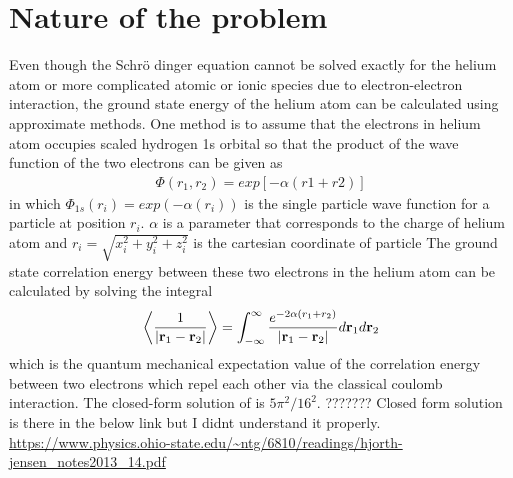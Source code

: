 \section{Nature of the problem}
\label{sec:NatureOfTheProblem}
Even though the Schr\"{o} dinger equation cannot be solved exactly for the helium atom or more complicated atomic or ionic species due to  electron-electron interaction, the ground state energy of the helium atom can be calculated using approximate methods. 
One method is to assume that the electrons in helium atom occupies scaled hydrogen 1s orbital so that the product of the wave function of the two electrons can be given as
\begin{align}
	\Phi (r_1, r_2 ) = exp[-\alpha ( r1+ r2)]
	\label{eq:NatureOfTheProblem1}
\end{align}
in which $\Phi_{1s}(r_i) = exp(-\alpha ( r_i))$ is the single particle wave function for a particle at position $r_i$.
$\alpha$ is a parameter that corresponds to the charge of helium atom and 
$r_i = \sqrt{x_i^2+y_i^2+z_i^2}$ 
is the cartesian coordinate of particle
The ground state correlation energy between these two electrons in the helium atom can be calculated by solving the integral
\begin{align}
	\left< \frac{1}{| \mbox{\textbf{r}}_1 - \mbox{\textbf{r}}_2 |} \right> 
   = \int _{-\infty } ^{\infty } \frac{e^{-2\alpha (r_1+r_2)}}{| \mbox{\textbf{r}}_1 - \mbox{\textbf{r}}_2 |} d \mbox{\textbf{r}}_1 d\mbox{\textbf{r}}_2
   \label{eq:NatureOfTheProblem2}
\end{align}
which is the quantum mechanical expectation value of the correlation energy between two electrons which repel each other via the classical coulomb interaction.
The closed-form solution of  is $5\pi ^2 / 16^2$.
??????? Closed form solution is there in the below link but I didnt understand it properly.
\url{https://www.physics.ohio-state.edu/~ntg/6810/readings/hjorth-jensen_notes2013_14.pdf}



